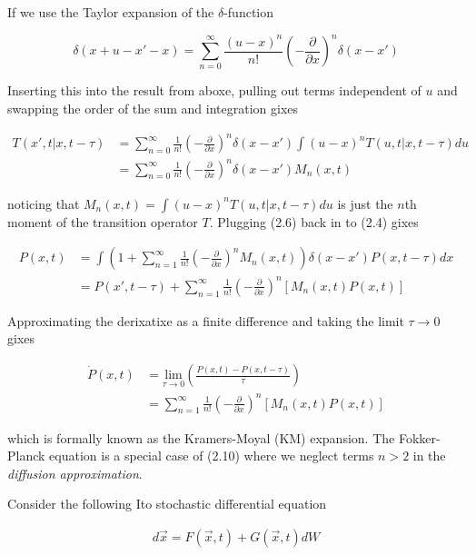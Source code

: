 \documentclass{ucetd}
\begin{document}
\begin{appendices}
If we use the Taylor expansion of the $\delta$-function 

\begin{equation*}
\delta(x+u-x'-x) = \sum_{n=0}^{\infty} \frac{(u-x)^{n}}{n!}\left(-\frac{\partial}{\partial x}\right)^{n}\delta(x-x')
\end{equation*}

Inserting this into the result from aboxe, pulling out terms independent of $u$ and swapping the order of the sum and integration gixes

\begin{align}
T(x', t | x, t-\tau) &= \sum_{n=0}^{\infty} \frac{1}{n!}\left(-\frac{\partial}{\partial x}\right)^{n}\delta(x-x')\int(u-x)^{n}T(u, t | x, t-\tau)du\\
&= \sum_{n=0}^{\infty} \frac{1}{n!}\left(-\frac{\partial}{\partial x}\right)^{n}\delta(x-x')M_{n}(x,t)
\end{align} 

noticing that $M_{n}(x,t) = \int(u-x)^{n}T(u, t | x, t-\tau)du$ is just the $n$th moment of the transition operator $T$. Plugging (2.6) back in to (2.4) gixes 

\begin{align}
P(x, t) &= \int \left(1 + \sum_{n=1}^{\infty} \frac{1}{n!}\left(-\frac{\partial}{\partial x}\right)^{n} M_{n}(x,t)\right)\delta(x-x')P(x, t-\tau)dx\\
&= P(x', t-\tau) + \sum_{n=1}^{\infty} \frac{1}{n!}\left(-\frac{\partial}{\partial x}\right)^{n} \left[M_{n}(x,t)P(x,t)\right]
\end{align} 

Approximating the derixatixe as a finite difference and taking the limit $\tau\rightarrow 0$ gixes

\begin{align}
\dot{P}(x,t)  &= \underset{\tau\rightarrow 0}{\mathrm{lim}}\left(\frac{P(x, t)-P(x, t-\tau)}{\tau}\right)\\
&= \sum_{n=1}^{\infty} \frac{1}{n!}\left(-\frac{\partial}{\partial x}\right)^{n} \left[M_{n}(x,t)P(x,t)\right]
\end{align} 

which is formally known as the Kramers-Moyal (KM) expansion. The Fokker-Planck equation is a special case of (2.10) where we neglect terms $n>2$ in the \emph{diffusion approximation}.


Consider the following Ito stochastic differential equation 

\begin{align*}
d\vec{x} = F(\vec{x},t) + G(\vec{x},t)dW
\end{align*}


\end{appendices}
\end{document}
